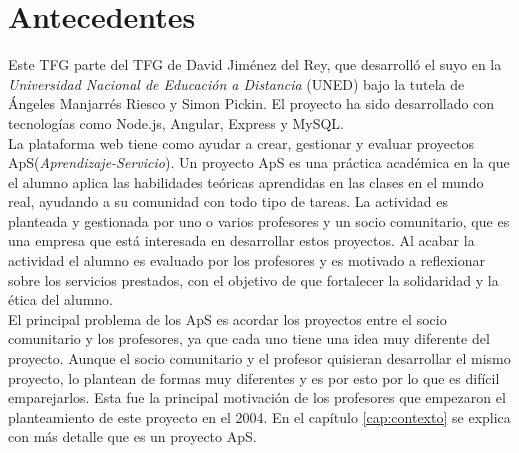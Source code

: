 \documentclass[11pt]{book}
\begin{document}
\section{Antecedentes}
Este TFG parte del TFG de David Jiménez del Rey, que desarrolló el suyo en la \emph{Universidad Nacional de Educación a Distancia} (UNED) bajo la tutela de Ángeles Manjarrés Riesco y Simon Pickin. El proyecto ha sido desarrollado con tecnologías como Node.js, Angular, Express y MySQL.\\
La plataforma web tiene como ayudar a crear, gestionar y evaluar proyectos ApS(\emph{Aprendizaje-Servicio}). Un proyecto ApS es una práctica académica en la que el alumno aplica las habilidades teóricas aprendidas en las clases en el mundo real, ayudando a su comunidad con todo tipo de tareas. La actividad es planteada y gestionada por uno o varios profesores y un socio comunitario, que es una empresa que está interesada en desarrollar estos proyectos. Al acabar la actividad el alumno es evaluado por los profesores y es motivado a reflexionar sobre los servicios prestados, con el objetivo de que fortalecer la solidaridad y la ética del alumno. \\
El principal problema de los ApS es acordar los proyectos entre el socio comunitario y los profesores, ya que cada uno tiene una idea muy diferente del proyecto. Aunque el socio comunitario y el profesor quisieran desarrollar el mismo proyecto, lo plantean de formas muy diferentes y es por esto por lo que es difícil emparejarlos. Esta fue la principal motivación de los profesores que empezaron el planteamiento de este proyecto en el 2004. En el capítulo \ref{cap:contexto} se explica con más detalle que es un proyecto ApS.\\
\end{document}
